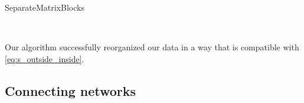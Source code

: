 \begin{refsection}
\begin{algorithm}
    \caption{SeparateMatrixBlocks}
    \label{algo:separate_matrix_blocks}
    \begin{algorithmic}
         
         
        \\ 
        \EndFunction
    \end{algorithmic}
\end{algorithm}

Our algorithm successfully reorganized our data in a way that is compatible with \cref{eq:s_outside_inside}.



\subsection{Connecting networks}


\end{refsection}
